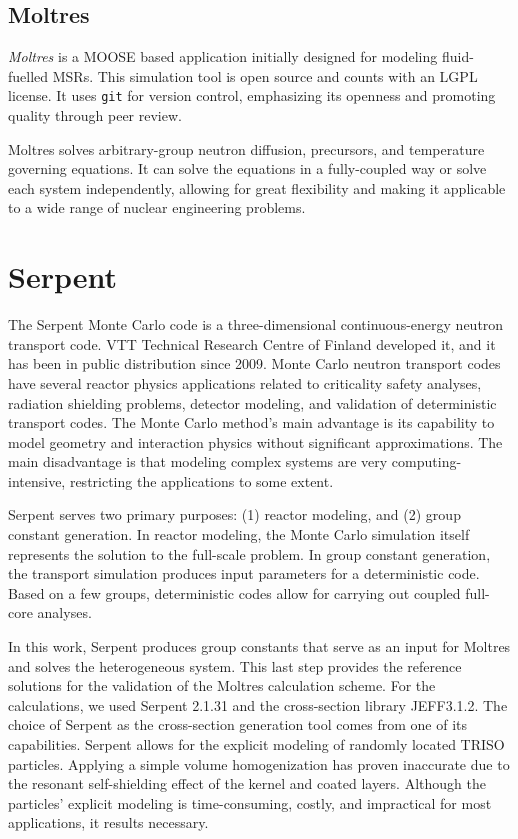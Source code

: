 \documentclass[11pt,letterpaper]{article}
\begin{document}
\subsection{Moltres}

\textit{Moltres} \cite{lindsay_introduction_2018} is a \gls{MOOSE} based application initially designed for modeling fluid-fuelled \glspl{MSR}.
This simulation tool is open source and counts with an LGPL license.
It uses \texttt{git} for version control, emphasizing its openness and promoting quality through peer review.

Moltres solves arbitrary-group neutron diffusion, precursors, and temperature governing equations.
It can solve the equations in a fully-coupled way or solve each system independently, allowing for great flexibility and making it applicable to a wide range of nuclear engineering problems.

\section{Serpent}

The Serpent Monte Carlo code \cite{leppanen_development_2007} \cite{leppanen_calculation_2014} is a three-dimensional continuous-energy neutron transport code.
VTT Technical Research Centre of Finland developed it, and it has been in public distribution since 2009.
Monte Carlo neutron transport codes have several reactor physics applications related to criticality safety analyses, radiation shielding problems, detector modeling, and validation of deterministic transport codes.
The Monte Carlo method's main advantage is its capability to model geometry and interaction physics without significant approximations.
The main disadvantage is that modeling complex systems are very computing-intensive, restricting the applications to some extent.

Serpent serves two primary purposes: (1) reactor modeling, and (2) group constant generation.
In reactor modeling, the Monte Carlo simulation itself represents the solution to the full-scale problem.
In group constant generation, the transport simulation produces input parameters for a deterministic code.
Based on a few groups, deterministic codes allow for carrying out coupled full-core analyses.

In this work, Serpent produces group constants that serve as an input for Moltres and solves the heterogeneous system.
This last step provides the reference solutions for the validation of the Moltres calculation scheme.
For the calculations, we used Serpent 2.1.31 and the cross-section library JEFF3.1.2. 
The choice of Serpent as the cross-section generation tool comes from one of its capabilities.
Serpent allows for the explicit modeling of randomly located TRISO particles.
Applying a simple volume homogenization has proven inaccurate due to the resonant self-shielding effect of the kernel and coated layers.
Although the particles' explicit modeling is time-consuming, costly, and impractical for most applications, it results necessary.
\end{document}

